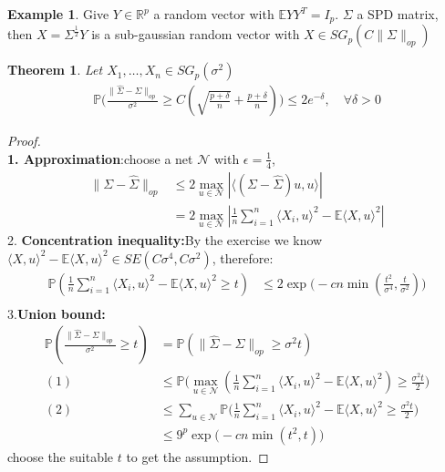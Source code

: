 \documentclass[a4paper,12pt, oneside, fleqn]{book}
\newtheorem{theorem}{Theorem}[section]
\theoremstyle{definition}
\newtheorem*{example}{Example}
\theoremstyle{remark}
\begin{document}
\begin{example}
	Give $Y \in \mathbb{R}^p $ a random vector with $\mathbb{E} Y Y^T = I_p$. $\Sigma$ a SPD matrix, then $X = \Sigma^{\frac{1}{2}} Y$ is a sub-gaussian random vector with $X \in SG_p(C\|\Sigma\|_{op})$
\end{example}

\begin{theorem}
Let $X_1, \dots, X_n \in SG_p(\sigma^2)$
\begin{align*}
	\mathbb{P}\bigg( \frac{\|\hat{\Sigma} - \Sigma\|_{op}}{\sigma^2} \geq 
	C(\sqrt{\frac{p+\delta}{n}} + \frac{p+ \delta}{n}) \bigg) \le2e^{-\delta}, \quad \forall \delta > 0
\end{align*}
\end{theorem}
\begin{proof}
	\quad\\
	\textbf{1. Approximation}:choose a net $\mathcal{N}$ with $\epsilon = \frac{1}{4}$, 
	\begin{align*}
		\|\Sigma - \hat{\Sigma}\|_{op} &\le 2\max_{u \in \mathcal{N}}|\langle (\Sigma - \hat{\Sigma})u, u \rangle|\\
		&= 2\max_{u \in \mathcal{N}}|\frac{1}{n}\sum_{i = 1}^n \langle X_i, u \rangle^2 - \mathbb{E}\langle X, u\rangle^2|
	\end{align*}
	2. \textbf{Concentration inequality:}By the exercise we know $\langle X, u\rangle^2 - \mathbb{E}\langle X, u\rangle^2 \in SE(C\sigma^4, C\sigma^2)$, therefore:
	\begin{align*}
		\mathbb{P}(\frac{1}{n}\sum_{i = 1}^n \langle X_i, u\rangle^2 - \mathbb{E}\langle X, u\rangle^2 \ge t) &\le 2\exp\bigg(-cn \min(\frac{t^2}{\sigma^4}, \frac{t}{\sigma^2})\bigg)\\
	\end{align*}
	3.\textbf{Union bound:}
	\begin{align*}
		\mathbb{P}(\frac{\|\hat{\Sigma} - \Sigma\|_{op}}{\sigma^2} \ge t) &= \mathbb{P}(\|\hat{\Sigma} - \Sigma\|_{op} \ge \sigma^2 t ) \\
		(1)&\le\mathbb{P}\bigg( \max_{u \in \mathcal{N}}(\frac{1}{n}\sum_{i = 1}^n \langle X_i, u\rangle^2- \mathbb{E}\langle X, u\rangle^2) \ge \frac{\sigma^2 t}{2} \bigg)\\
		(2)&\le\sum_{u \in \mathcal{N}}\mathbb{P}\bigg( \frac{1}{n} \sum_{i = 1}^n \langle X_i, u\rangle^2 - \mathbb{E} \langle X, u\rangle^2 \geq \frac{\sigma^2 t}{2}\bigg)\\
		&\le 9^p \exp\bigg(-cn \min(t^2, t)\bigg)
	\end{align*}
	choose the suitable $t$ to get the assumption.
\end{proof}
\end{document}
